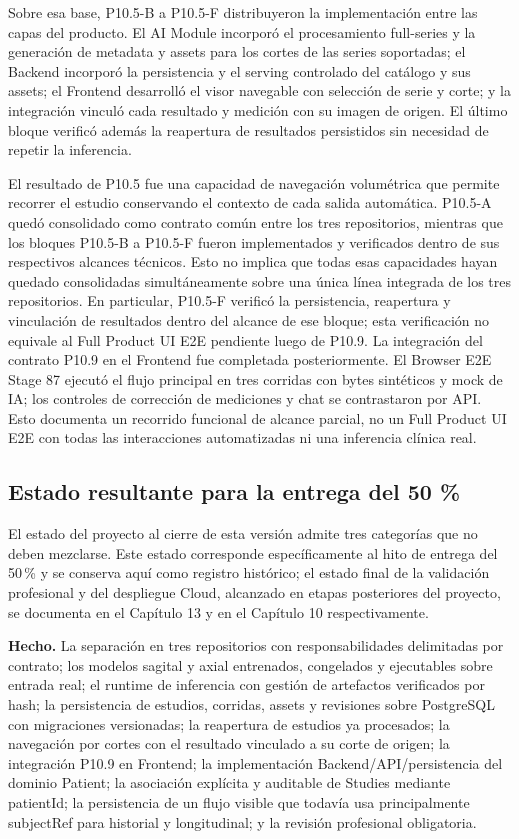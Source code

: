 Sobre esa base, P10.5-B a P10.5-F distribuyeron la implementación entre las capas del producto. El AI Module incorporó el procesamiento full-series y la generación de metadata y assets para los cortes de las series soportadas; el Backend incorporó la persistencia y el serving controlado del catálogo y sus assets; el Frontend desarrolló el visor navegable con selección de serie y corte; y la integración vinculó cada resultado y medición con su imagen de origen. El último bloque verificó además la reapertura de resultados persistidos sin necesidad de repetir la inferencia.

El resultado de P10.5 fue una capacidad de navegación volumétrica que permite recorrer el estudio conservando el contexto de cada salida automática. P10.5-A quedó consolidado como contrato común entre los tres repositorios, mientras que los bloques P10.5-B a P10.5-F fueron implementados y verificados dentro de sus respectivos alcances técnicos. Esto no implica que todas esas capacidades hayan quedado consolidadas simultáneamente sobre una única línea integrada de los tres repositorios. En particular, P10.5-F verificó la persistencia, reapertura y vinculación de resultados dentro del alcance de ese bloque; esta verificación no equivale al Full Product UI E2E pendiente luego de P10.9. La integración del contrato P10.9 en el Frontend fue completada posteriormente. El Browser E2E Stage 87 ejecutó el flujo principal en tres corridas con bytes sintéticos y mock de IA; los controles de corrección de mediciones y chat se contrastaron por API. Esto documenta un recorrido funcional de alcance parcial, no un Full Product UI E2E con todas las interacciones automatizadas ni una inferencia clínica real.

\subsection{Estado resultante para la entrega del 50 \%}
\label{anexo:f-estado-entrega-50}

El estado del proyecto al cierre de esta versión admite tres categorías que no deben mezclarse. Este estado corresponde específicamente al hito de entrega del 50\,\% y se conserva aquí como registro histórico; el estado final de la validación profesional y del despliegue Cloud, alcanzado en etapas posteriores del proyecto, se documenta en el Capítulo 13 y en el Capítulo 10 respectivamente.

\textbf{Hecho.} La separación en tres repositorios con responsabilidades delimitadas por contrato; los modelos sagital y axial entrenados, congelados y ejecutables sobre entrada real; el runtime de inferencia con gestión de artefactos verificados por hash; la persistencia de estudios, corridas, assets y revisiones sobre PostgreSQL con migraciones versionadas; la reapertura de estudios ya procesados; la navegación por cortes con el resultado vinculado a su corte de origen; la integración P10.9 en Frontend; la implementación Backend/API/persistencia del dominio Patient; la asociación explícita y auditable de Studies mediante patientId; la persistencia de un flujo visible que todavía usa principalmente subjectRef para historial y longitudinal; y la revisión profesional obligatoria.

